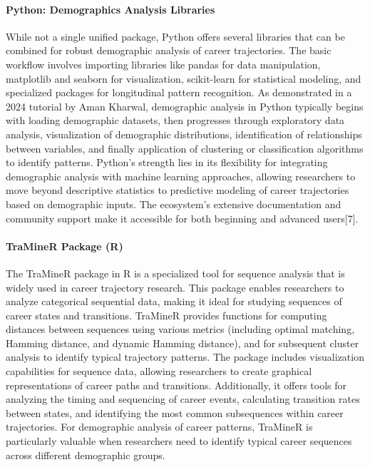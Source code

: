 \documentclass[./main.tex]{subfiles}
\begin{document}
\paragraph{Python: Demographics Analysis
Libraries}\label{python-demographics-analysis-libraries}

While not a single unified package, Python offers several libraries that
can be combined for robust demographic analysis of career trajectories.
The basic workflow involves importing libraries like pandas for data
manipulation, matplotlib and seaborn for visualization, scikit-learn for
statistical modeling, and specialized packages for longitudinal pattern
recognition. As demonstrated in a 2024 tutorial by Aman Kharwal,
demographic analysis in Python typically begins with loading demographic
datasets, then progresses through exploratory data analysis,
visualization of demographic distributions, identification of
relationships between variables, and finally application of clustering
or classification algorithms to identify patterns. Python's strength
lies in its flexibility for integrating demographic analysis with
machine learning approaches, allowing researchers to move beyond
descriptive statistics to predictive modeling of career trajectories
based on demographic inputs. The ecosystem's extensive documentation and
community support make it accessible for both beginning and advanced
users{[}7{]}.

\paragraph{TraMineR Package (R)}\label{traminer-package-r}

The TraMineR package in R is a specialized tool for sequence analysis
that is widely used in career trajectory research. This package enables
researchers to analyze categorical sequential data, making it ideal for
studying sequences of career states and transitions. TraMineR provides
functions for computing distances between sequences using various
metrics (including optimal matching, Hamming distance, and dynamic
Hamming distance), and for subsequent cluster analysis to identify
typical trajectory patterns. The package includes visualization
capabilities for sequence data, allowing researchers to create graphical
representations of career paths and transitions. Additionally, it offers
tools for analyzing the timing and sequencing of career events,
calculating transition rates between states, and identifying the most
common subsequences within career trajectories. For demographic analysis
of career patterns, TraMineR is particularly valuable when researchers
need to identify typical career sequences across different demographic
groups.
\end{document}
